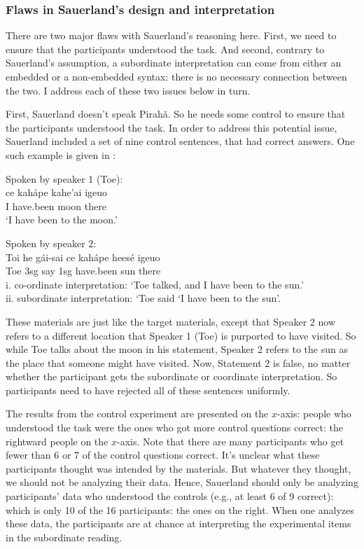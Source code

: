 \documentclass[output=paper]{langscibook}
\begin{document}
\subsubsection{Flaws in Sauerland's design and interpretation}

There are two major flaws with Sauerland’s reasoning here. First, we need to ensure that the participants understood the task. And second, contrary to Sauerland's assumption, a subordinate interpretation can come from either an embedded or a non-embedded syntax: there is no necessary connection between the two.  I address each of these two issues below in turn.

First, Sauerland doesn't speak Pirahã. So he needs some control to ensure that the participants understood the task. In order to address this potential issue, Sauerland included a set of nine control sentences, that had correct answers.  One such example is given in :

\eal
\label{sauerland_ex_cont}
\ex \label{sauerland_ex1_cont} Spoken by speaker 1 (Toe):\\
\gll
ce  kahápe kahe’ai igeuo \\ 
I   have.been moon there\\
\glt `I have been to the moon.'

\ex \label{sauerland_ex2_cont} Spoken by speaker 2:\\
\gll 
Toi he gái-sai ce kahápe heesé igeuo \\
Toe 3sg say 1sg have.been sun there\\
\glt i. co-ordinate interpretation: `Toe talked, and I have been to the sun.'\\
     ii. subordinate interpretation: `Toe said ‘I have been to the sun’.
\zl

These materials are just like the target materials, except that Speaker 2 now refers to a different location that Speaker 1 (Toe) is purported to have visited.  So while Toe talks about the moon in his statement, Speaker 2 refers to the sun as the place that someone might have visited.  Now, Statement 2 is false, no matter whether the participant gets the subordinate or coordinate interpretation.  So participants need to have rejected all of these sentences uniformly.

The results from the control experiment are presented on the $x$-axis:  people who understood the task were the ones who got more control questions correct: the rightward people on the $x$-axis.  Note that there are many participants who get fewer than 6 or 7 of the control questions correct.  It's unclear what these participants thought was intended by the materials.  But whatever they thought, we should not be analyzing their data. Hence, Sauerland should only be analyzing participants’ data who understood the controls (e.g., at least 6 of 9 correct):  which is only 10 of the 16 participants: the ones on the right. When one analyzes these data, the participants are at chance at interpreting the experimental items in the subordinate reading.
\end{document}
